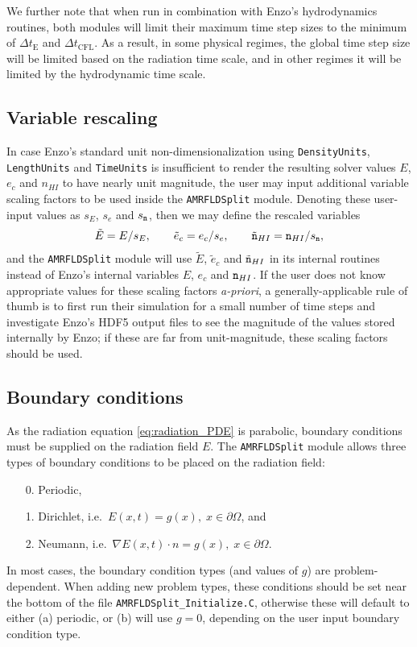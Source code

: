 \documentclass[letterpaper,10pt]{article}
\renewcommand{\(}{\left(}
\renewcommand{\)}{\right)}
\newcommand{\dt}{\Delta t}
\newcommand{\mn}{{\tt n}}
\begin{document}
We further note that when run in combination with Enzo's hydrodynamics
routines, both modules will limit their maximum time step sizes to the
minimum of $\dt_{\text{E}}$ and $\dt_{\text{CFL}}$.  As a result, in
some physical regimes, the global time step size will be limited based
on the radiation time scale, and in other regimes it will be limited
by the hydrodynamic time scale. 



\subsection{Variable rescaling}
\label{sec:AMRFLDSplit_variable_rescaling}

In case Enzo's standard unit non-dimensionalization using 
{\tt DensityUnits}, {\tt LengthUnits} and {\tt TimeUnits} is
insufficient to render the resulting solver values $E$, $e_c$ and
$n_{HI}$ to have nearly unit magnitude, the user may input additional
variable scaling factors to be used inside the {\tt AMRFLDSplit}
module.  Denoting these user-input values as $s_E$, $s_e$ and
$s_{\mn}$, then we may define the rescaled variables
\begin{align}
\label{eq:variable_rescaling}
  \tilde{E} = E / s_E, \qquad \tilde{e}_c = e_c / s_e, \qquad 
  \tilde{\mn}_{HI} = \mn_{HI} / s_{\mn},
\end{align}
and the {\tt AMRFLDSplit} module will use $\tilde{E}$, $\tilde{e}_c$ and
$\tilde{\mn}_{HI}$ in its internal routines instead of Enzo's internal
variables $E$, $e_c$ and $\mn_{HI}$.  If the user does not know
appropriate values for these scaling factors {\em a-priori}, a
generally-applicable rule of thumb is to first run their simulation
for a small number of time steps and investigate Enzo's HDF5 output
files to see the magnitude of the values stored internally by Enzo; if
these are far from unit-magnitude, these scaling factors should be
used. 



\subsection{Boundary conditions}
\label{sec:AMRFLDSplit_boundary_conditions}

As the radiation equation \eqref{eq:radiation_PDE} is parabolic,
boundary conditions must be supplied on the radiation field $E$.  The
{\tt AMRFLDSplit} module allows three types of boundary conditions to
be placed on the radiation field:
\begin{itemize}
\item[0.] Periodic,
\item[1.] Dirichlet, i.e.~$E(x,t) = g(x), \; x\in\partial\Omega$, and
\item[2.] Neumann, i.e.~$\nabla E(x,t)\cdot n = g(x), \; x\in\partial\Omega$.
\end{itemize}
In most cases, the boundary condition types (and values of $g$) are
problem-dependent.  When adding new problem types, these conditions
should be set near the bottom of the file {\tt AMRFLDSplit\_Initialize.C}, 
otherwise these will default to either (a) periodic, or (b) will use
$g=0$, depending on the user input boundary condition type.
\end{document}

